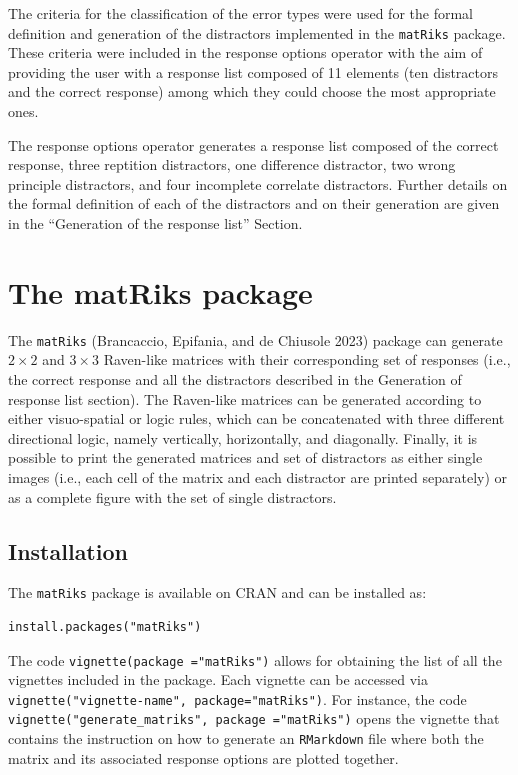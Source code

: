 The criteria for the classification of the error types were used for the formal definition and generation of the distractors implemented in the \texttt{matRiks} package.
These criteria were included in the response options operator with the aim of providing the user with a response list composed of 11 elements (ten distractors and the correct response) among which they could choose the most appropriate ones.

The response options operator generates a response list composed of the correct response, three reptition distractors, one difference distractor, two wrong principle distractors, and four incomplete correlate distractors.
Further details on the formal definition of each of the distractors and on their generation are given in the ``Generation of the response list'' Section.

\hypertarget{the-matriks-package}{%
\section{The matRiks package}\label{the-matriks-package}}

The \texttt{matRiks} (Brancaccio, Epifania, and de Chiusole 2023) package can generate \(2 \times 2\) and \(3 \times 3\) Raven-like matrices with their corresponding set of responses (i.e., the correct response and all the distractors described in the Generation of response list section). The Raven-like matrices can be generated according to either visuo-spatial or logic rules, which can be concatenated with three different directional logic, namely vertically, horizontally, and diagonally.
Finally, it is possible to print the generated matrices and set of distractors as either single images (i.e., each cell of the matrix and each distractor are printed separately) or as a complete figure with the set of single distractors.

\hypertarget{installation}{%
\subsection{Installation}\label{installation}}

The \texttt{matRiks} package is available on CRAN and can be installed as:

\begin{verbatim}
install.packages("matRiks")
\end{verbatim}

The code \texttt{vignette(package\ ="matRiks")} allows for obtaining the list of all the vignettes included in the package. Each vignette can be accessed via \texttt{vignette("vignette-name",\ package="matRiks")}. For instance, the code \texttt{vignette("generate\_matriks",\ package\ ="matRiks")} opens the vignette that contains the instruction on how to generate an \texttt{RMarkdown} file where both the matrix and its associated response options are plotted together.

